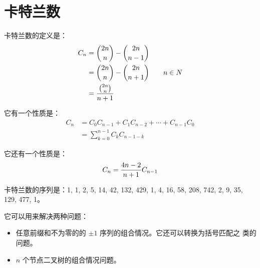\section{卡特兰数}

卡特兰数的定义是：\[
    \begin{aligned}
    C_n & = {2n \choose n} - {2n \choose n - 1} \\
        & = {2n \choose n} - {2n \choose n + 1} \\
        & = {{2n \choose n} \over n + 1}
    \end{aligned}
    \qquad n \in N
\]

它有一个性质是：\[
    \begin{aligned}
        C_n & = C_0 C_{n-1} + C_1 C_{n-2} + \cdots + C_{n-1} C_0 \\
            & = \sum_{k=0}^{n-1} C_k C_{n-1-k}
    \end{aligned}
\]

它还有一个性质是：\[
    C_n = {4n - 2 \over n + 1} C_{n-1}
\]

卡特兰数的序列是：1, 1, 2, 5, 14, 42, 132, 429, 1, 4, 16,
58, 208, 742, 2, 9, 35,
129, 477, 1。

它可以用来解决两种问题：
\begin{itemize}
    \item 任意前缀和不为零的的 $\pm 1$ 序列的组合情况。它还可以转换为括号匹配之
        类的问题。
    \item $n$ 个节点二叉树的组合情况问题。
\end{itemize}


